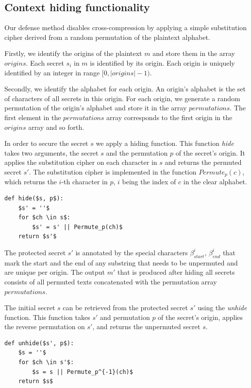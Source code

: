 \subsection{Context hiding functionality}
Our defense method disables cross-compression by applying a simple substitution
cipher derived from a random permutation of the plaintext alphabet.

Firstly, we identify the origins of the plaintext $m$ and store them in the
array $origins$. Each secret $s_i$ in $m$ is identified by its origin. Each
origin is uniquely identified by an integer in range $[0, |origins|-1)$.

Secondly, we identify the alphabet for each origin. An origin's alphabet is the
set of characters of all secrets in this origin. For each origin, we generate a
random permutation of the origin's alphabet and store it in the array
$permutations$. The first element in the $permutations$ array corresponds to the
first origin in the $origins$ array and so forth.

In order to secure the secret $s$ we apply a hiding function. This function
\textit{hide} takes two arguments, the secret $s$ and the permutation $p$ of the
secret's origin. It applies the substitution cipher on each character in $s$ and
returns the permuted secret $s'$. The substitution cipher is implemented in the
function $Permute_p(c)$, which returns the $i$-th character in $p$, $i$ being
the index of $c$ in the clear alphabet.

\begin{lstlisting}[texcl,mathescape,basicstyle=\small]
def hide($s, p$):
    $s' = ''$
    for $ch \in s$:
        $s' = s' || Permute_p(ch)$
    return $s'$
\end{lstlisting}

The protected secret $s'$ is annotated by the special characters
$\beta_{start}^i$, $\beta_{end}^i$ that mark the start and the end of any
substring that needs to be unpermuted and are unique per origin. The output $m'$
that is produced after hiding all secrets consists of all permuted texts
concatenated with the permutation array $permutations$.

The initial secret $s$ can be retrieved from the protected secret $s'$ using the
\textit{unhide} function. This function takes $s'$ and permutation $p$ of the
secret's origin, applies the reverse permutation on $s'$, and returns the
unpermuted secret $s$.

\begin{lstlisting}[texcl,mathescape,basicstyle=\small]
def unhide($s', p$):
    $s = ''$
    for $ch \in s'$:
        $s = s || Permute_p^{-1}(ch)$
    return $s$
\end{lstlisting}

